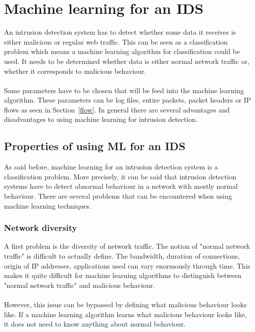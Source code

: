 
\chapter{Machine learning for an IDS} %

\label{Chapter3} %

An intrusion detection system has to detect whether some data it receives is either malicious or regular web traffic. This can be seen as a classification problem which means a machine learning algorithm for classification could be used. It needs to be determined whether data is either normal network traffic or, whether it corresponds to malicious behaviour. \\
\\
Some parameters have to be chosen that will be feed into the machine learning algorithm. These parameters can be log files, entire packets, packet headers or IP flows as seen in Section~\ref{flow}. In general there are several advantages and disadvantages to using machine learning for intrusion detection.

\section{Properties of using ML for an IDS}
As said before, machine learning for an intrusion detection system is a classification problem. More precisely, it can be said that intrusion detection systems have to detect abnormal behaviour in a network with mostly normal behaviour. There are several problems that can be encountered when using machine learning techniques.

\subsection{Network diversity}
A first problem is the diversity of network traffic. The notion of "normal network traffic" is difficult to actually define. The bandwidth, duration of connections, origin of IP addresses, applications used can vary enormously through time. This makes it quite difficult for machine learning algorithms to distinguish between "normal network traffic" and malicious behaviour.\cite{ClosedWorld} \\
\\
However, this issue can be bypassed by defining what malicious behaviour looks like. If a machine learning algorithm learns what malicious behaviour looks like, it does not need to know anything about normal behaviour. 

